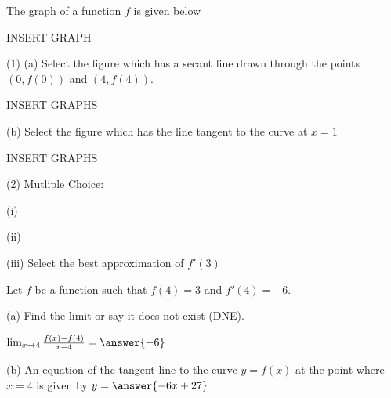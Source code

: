 \documentclass{ximera}
\begin{document}
\begin{exercise}
The graph of a function $f$ is given below

INSERT GRAPH

(1) (a) Select the figure which has a secant line drawn through the points $(0,f(0))$ and $(4,f(4))$.

INSERT GRAPHS

(b) Select the figure which has the line tangent to the curve at $x=1$

INSERT GRAPHS

(2) Mutliple Choice:

(i) \begin{multipleChoice}
\end{multipleChoice}

(ii) \begin{multipleChoice}
\end{multipleChoice}

(iii) Select the best approximation of $f'(3)$
\begin{multipleChoice}
\end{multipleChoice}
\end{exercise}

\begin{exercise}
Let $f$ be a function such that $f(4)=3$ and $f'(4)=-6$.

(a) Find the limit or say it does not exist (DNE).

$\lim_{x\to 4} \frac{f(x)-f(4)}{x-4}=\answer{-6}$

(b) An equation of the tangent line to the curve $y=f(x)$ at the point where $x=4$ is given by $y=\answer{-6x+27}$
\end{exercise}
\end{document}
